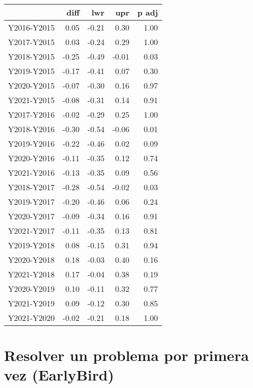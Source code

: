 \begin{table}[H]
\centering
\begin{tabular}{rrrrr}
  \hline
 & diff & lwr & upr & p adj \\ 
  \hline
Y2016-Y2015 & 0.05 & -0.21 & 0.30 & 1.00 \\ 
  Y2017-Y2015 & 0.03 & -0.24 & 0.29 & 1.00 \\ 
  Y2018-Y2015 & -0.25 & -0.49 & -0.01 & 0.03 \\ 
  Y2019-Y2015 & -0.17 & -0.41 & 0.07 & 0.30 \\ 
  Y2020-Y2015 & -0.07 & -0.30 & 0.16 & 0.97 \\ 
  Y2021-Y2015 & -0.08 & -0.31 & 0.14 & 0.91 \\ 
  Y2017-Y2016 & -0.02 & -0.29 & 0.25 & 1.00 \\ 
  Y2018-Y2016 & -0.30 & -0.54 & -0.06 & 0.01 \\ 
  Y2019-Y2016 & -0.22 & -0.46 & 0.02 & 0.09 \\ 
  Y2020-Y2016 & -0.11 & -0.35 & 0.12 & 0.74 \\ 
  Y2021-Y2016 & -0.13 & -0.35 & 0.09 & 0.56 \\ 
  Y2018-Y2017 & -0.28 & -0.54 & -0.02 & 0.03 \\ 
  Y2019-Y2017 & -0.20 & -0.46 & 0.06 & 0.24 \\ 
  Y2020-Y2017 & -0.09 & -0.34 & 0.16 & 0.91 \\ 
  Y2021-Y2017 & -0.11 & -0.35 & 0.13 & 0.81 \\ 
  Y2019-Y2018 & 0.08 & -0.15 & 0.31 & 0.94 \\ 
  Y2020-Y2018 & 0.18 & -0.03 & 0.40 & 0.16 \\ 
  Y2021-Y2018 & 0.17 & -0.04 & 0.38 & 0.19 \\ 
  Y2020-Y2019 & 0.10 & -0.11 & 0.32 & 0.77 \\ 
  Y2021-Y2019 & 0.09 & -0.12 & 0.30 & 0.85 \\ 
  Y2021-Y2020 & -0.02 & -0.21 & 0.18 & 1.00 \\ 
   \hline
\end{tabular}
\end{table}



\section{Resolver un problema por primera vez (EarlyBird)}

